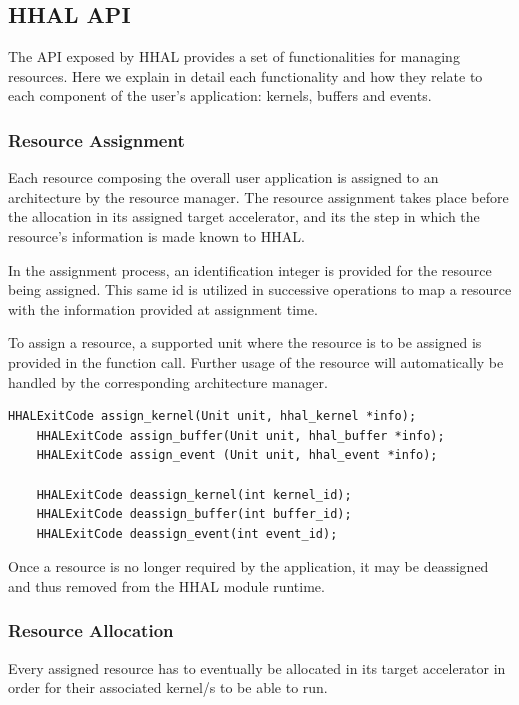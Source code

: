 \subsection{HHAL API}

The API exposed by HHAL provides a set of functionalities for managing resources. Here we explain in detail each functionality and how they relate to each component of the user's application: kernels, buffers and events.

\subsubsection{Resource Assignment}

Each resource composing the overall user application is assigned to an architecture by the resource manager. The resource assignment takes place before the allocation in its assigned target accelerator, and its the step in which the resource's information is made known to HHAL.

In the assignment process, an identification integer is provided for the resource being assigned. This same id is utilized in successive operations to map a resource with the information provided at assignment time.

To assign a resource, a supported unit where the resource is to be assigned is provided in the function call. Further usage of the resource will automatically be handled by the corresponding architecture manager.

\begin{lstlisting}[style=CStyle, caption=HHAL API - Assign functions]
    HHALExitCode assign_kernel(Unit unit, hhal_kernel *info);
    HHALExitCode assign_buffer(Unit unit, hhal_buffer *info);
    HHALExitCode assign_event (Unit unit, hhal_event *info);

    HHALExitCode deassign_kernel(int kernel_id);
    HHALExitCode deassign_buffer(int buffer_id);
    HHALExitCode deassign_event(int event_id);
\end{lstlisting}

Once a resource is no longer required by the application, it may be deassigned and thus removed from the HHAL module runtime.

\subsubsection{Resource Allocation}

Every assigned resource has to eventually be allocated in its target accelerator in order for their associated kernel/s to be able to run.

